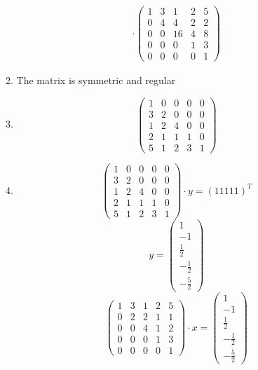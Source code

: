 \documentclass[]{book}
\theoremstyle{definition}
\begin{document}
\begin{enumerate}
\begin{enumerate}
\begin{align*}
            \cdot
            \begin{pmatrix}
                1 & 3 & 1 & 2 & 5 \\
                0 & 4 & 4 & 2 & 2 \\
                0 & 0 & 16 & 4 & 8 \\
                0 & 0 & 0 & 1 & 3 \\
                0 & 0 & 0 & 0 & 1 
            \end{pmatrix}
        \end{align*}
        \item The matrix is symmetric and regular
        \item $$\begin{pmatrix}
            1 & 0 & 0 & 0 & 0 \\
            3 & 2 & 0 & 0 & 0 \\
            1 & 2 & 4 & 0 & 0 \\
            2 & 1 & 1 & 1 & 0 \\
            5 & 1 & 2 & 3 & 1
        \end{pmatrix}$$
        \item
            $$\begin{pmatrix}
                1 & 0 & 0 & 0 & 0 \\
                3 & 2 & 0 & 0 & 0 \\
                1 & 2 & 4 & 0 & 0 \\
                2 & 1 & 1 & 1 & 0 \\
                5 & 1 & 2 & 3 & 1
            \end{pmatrix}
            \cdot 
            y
            =
            (1 1 1 1 1)^T$$
        $$y = \begin{pmatrix} 1 \\ -1 \\ \frac{1}{2} \\ -\frac{1}{2} \\ -\frac{5}{2} \end{pmatrix}$$
        $$ \begin{pmatrix}
            1 & 3 & 1 & 2 & 5 \\
            0 & 2 & 2 & 1 & 1 \\
            0 & 0 & 4 & 1 & 2 \\
            0 & 0 & 0 & 1 & 3 \\
            0 & 0 & 0 & 0 & 1
        \end{pmatrix}
        \cdot 
        x
        =
        \begin{pmatrix} 1 \\ -1 \\ \frac{1}{2} \\ -\frac{1}{2} \\ -\frac{5}{2} \end{pmatrix}$$

\end{enumerate}
\end{enumerate}
\end{document}
